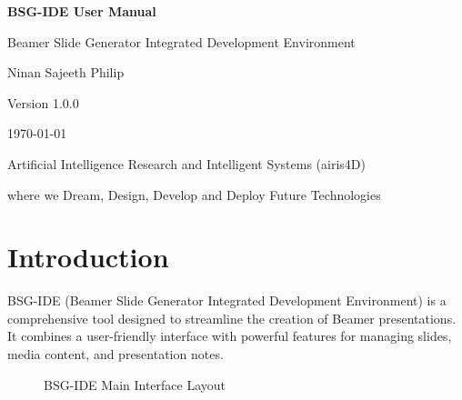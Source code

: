 \documentclass[11pt,a4paper]{article}
\begin{document}
\begin{titlepage}
    \centering
    \vspace*{3cm}
    {\Huge \textbf{BSG-IDE User Manual}\par}
    \vspace{2cm}
    {\Large Beamer Slide Generator Integrated Development Environment\par}
    \vspace{3cm}
    {\large{Ninan Sajeeth Philip}\par}
    {\large Version 1.0.0\par}
    \vspace{2cm}
    {\large \today\par}
    \vspace{3cm}
    {\large Artificial Intelligence Research and Intelligent Systems (airis4D)\par}
     {\large where we Dream, Design, Develop and Deploy Future Technologies\par}
\end{titlepage}

\tableofcontents
\newpage

\section{Introduction}

BSG-IDE (Beamer Slide Generator Integrated Development Environment) is a comprehensive tool designed to streamline the creation of Beamer presentations. It combines a user-friendly interface with powerful features for managing slides, media content, and presentation notes.

\begin{figure}[H]
\centering
{}
\caption{BSG-IDE Main Interface Layout}
\end{figure}
\end{document}
